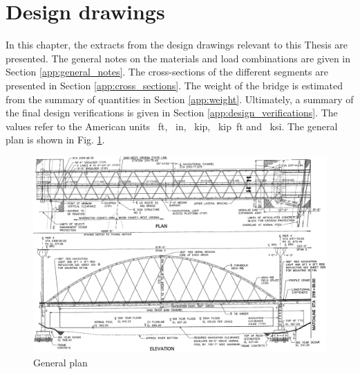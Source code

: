 \section{Design drawings}
In this chapter, the extracts from the design drawings relevant to this Thesis are presented. The general notes on the materials and load combinations are given in Section \ref{app:general_notes}. The cross-sections of the different segments are presented in Section \ref{app:cross_sections}. The weight of the bridge is estimated from the summary of quantities in Section \ref{app:weight}. Ultimately, a summary of the final design verifications is given in Section \ref{app:design_verifications}. The values refer to the American units \SI{}{ft}, \SI{}{in}, \SI{}{kip}, \SI{}{kip ft} and \SI{}{ksi}. The general plan is shown in Fig. \ref{fig:general_plan}.
\begin{figure}[H]
    \centering
    \includegraphics[width=\textwidth]{overleaf/Appendix/Design drawings/General Plan.png}
    \caption{General plan}
    \label{fig:general_plan}
\end{figure}

